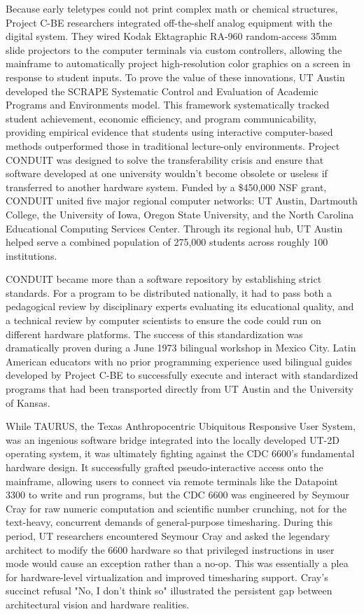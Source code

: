 Because early teletypes could not print complex math or chemical structures, Project C-BE researchers integrated off-the-shelf analog equipment with the digital system. They wired Kodak Ektagraphic RA-960 random-access 35mm slide projectors to the computer terminals via custom controllers, allowing the mainframe to automatically project high-resolution color graphics on a screen in response to student inputs. To prove the value of these innovations, UT Austin developed the SCRAPE Systematic Control and Evaluation of Academic Programs and Environments model. This framework systematically tracked student achievement, economic efficiency, and program communicability, providing empirical evidence that students using interactive computer-based methods outperformed those in traditional lecture-only environments.
Project CONDUIT was designed to solve the transferability crisis and ensure that software developed at one university wouldn't become obsolete or useless if transferred to another hardware system. Funded by a \$450,000 NSF grant, CONDUIT united five major regional computer networks: UT Austin, Dartmouth College, the University of Iowa, Oregon State University, and the North Carolina Educational Computing Services Center. Through its regional hub, UT Austin helped serve a combined population of 275,000 students across roughly 100 institutions.

CONDUIT became more than a software repository by establishing strict standards. For a program to be distributed nationally, it had to pass both a pedagogical review by disciplinary experts evaluating its educational quality, and a technical review by computer scientists to ensure the code could run on different hardware platforms. The success of this standardization was dramatically proven during a June 1973 bilingual workshop in Mexico City. Latin American educators with no prior programming experience used bilingual guides developed by Project C-BE to successfully execute and interact with standardized programs that had been transported directly from UT Austin and the University of Kansas.

While TAURUS, the Texas Anthropocentric Ubiquitous Responsive User System, was an ingenious software bridge integrated into the locally developed UT-2D operating system, it was ultimately fighting against the CDC 6600's fundamental hardware design. It successfully grafted pseudo-interactive access onto the mainframe, allowing users to connect via remote terminals like the Datapoint 3300 to write and run programs, but the CDC 6600 was engineered by Seymour Cray for raw numeric computation and scientific number crunching, not for the text-heavy, concurrent demands of general-purpose timesharing. During this period, UT researchers encountered Seymour Cray and asked the legendary architect to modify the 6600 hardware so that privileged instructions in user mode would cause an exception rather than a no-op. This was essentially a plea for hardware-level virtualization and improved timesharing support. Cray’s succinct refusal "No, I don’t think so" illustrated the persistent gap between architectural vision and hardware realities. 

